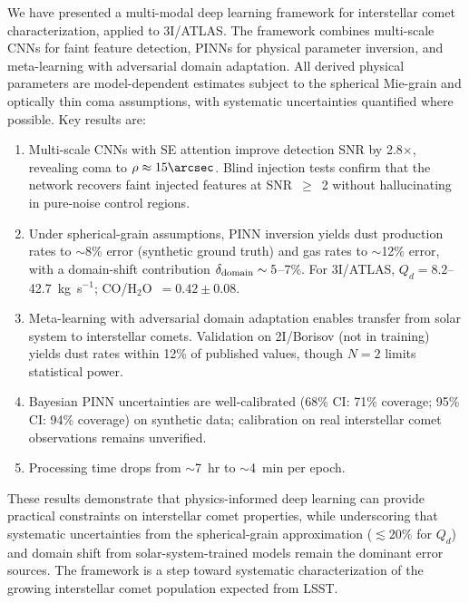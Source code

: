 \documentclass[preprint2]{aastex631}
\begin{document}
We have presented a multi-modal deep learning framework for interstellar comet characterization, applied to 3I/ATLAS. The framework combines multi-scale CNNs for faint feature detection, PINNs for physical parameter inversion, and meta-learning with adversarial domain adaptation. All derived physical parameters are model-dependent estimates subject to the spherical Mie-grain and optically thin coma assumptions, with systematic uncertainties quantified where possible. Key results are:

\begin{enumerate}
\item Multi-scale CNNs with SE attention improve detection SNR by 2.8$\times$, revealing coma to $\rho \approx 15\arcsec$. Blind injection tests confirm that the network recovers faint injected features at SNR~$\geq$~2 without hallucinating in pure-noise control regions.
\item Under spherical-grain assumptions, PINN inversion yields dust production rates to $\sim$8\% error (synthetic ground truth) and gas rates to $\sim$12\% error, with a domain-shift contribution $\delta_{\rm domain} \sim 5$--7\%. For 3I/ATLAS, $Q_d = 8.2$--42.7~kg~s$^{-1}$; CO/H$_2$O~$= 0.42 \pm 0.08$.
\item Meta-learning with adversarial domain adaptation enables transfer from solar system to interstellar comets. Validation on 2I/Borisov (not in training) yields dust rates within 12\% of published values, though $N=2$ limits statistical power.
\item Bayesian PINN uncertainties are well-calibrated (68\% CI: 71\% coverage; 95\% CI: 94\% coverage) on synthetic data; calibration on real interstellar comet observations remains unverified.
\item Processing time drops from $\sim$7~hr to $\sim$4~min per epoch.
\end{enumerate}

These results demonstrate that physics-informed deep learning can provide practical constraints on interstellar comet properties, while underscoring that systematic uncertainties from the spherical-grain approximation ($\lesssim 20\%$ for $Q_d$) and domain shift from solar-system-trained models remain the dominant error sources. The framework is a step toward systematic characterization of the growing interstellar comet population expected from LSST.
\end{document}
